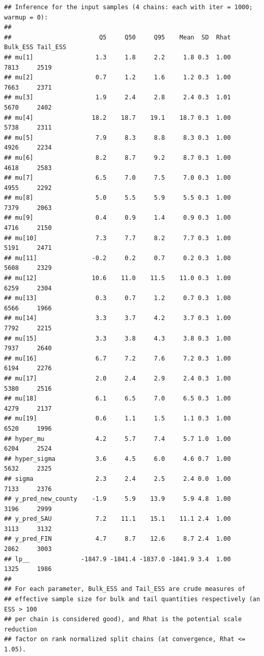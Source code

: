 \documentclass[
]{article}
\begin{document}
\begin{verbatim}
## Inference for the input samples (4 chains: each with iter = 1000; warmup = 0):
## 
##                        Q5     Q50     Q95    Mean  SD  Rhat Bulk_ESS Tail_ESS
## mu[1]                 1.3     1.8     2.2     1.8 0.3  1.00     7813     2519
## mu[2]                 0.7     1.2     1.6     1.2 0.3  1.00     7663     2371
## mu[3]                 1.9     2.4     2.8     2.4 0.3  1.01     5670     2402
## mu[4]                18.2    18.7    19.1    18.7 0.3  1.00     5738     2311
## mu[5]                 7.9     8.3     8.8     8.3 0.3  1.00     4926     2234
## mu[6]                 8.2     8.7     9.2     8.7 0.3  1.00     4618     2583
## mu[7]                 6.5     7.0     7.5     7.0 0.3  1.00     4955     2292
## mu[8]                 5.0     5.5     5.9     5.5 0.3  1.00     7379     2063
## mu[9]                 0.4     0.9     1.4     0.9 0.3  1.00     4716     2150
## mu[10]                7.3     7.7     8.2     7.7 0.3  1.00     5191     2471
## mu[11]               -0.2     0.2     0.7     0.2 0.3  1.00     5608     2329
## mu[12]               10.6    11.0    11.5    11.0 0.3  1.00     6259     2304
## mu[13]                0.3     0.7     1.2     0.7 0.3  1.00     6566     1966
## mu[14]                3.3     3.7     4.2     3.7 0.3  1.00     7792     2215
## mu[15]                3.3     3.8     4.3     3.8 0.3  1.00     7937     2640
## mu[16]                6.7     7.2     7.6     7.2 0.3  1.00     6194     2276
## mu[17]                2.0     2.4     2.9     2.4 0.3  1.00     5380     2516
## mu[18]                6.1     6.5     7.0     6.5 0.3  1.00     4279     2137
## mu[19]                0.6     1.1     1.5     1.1 0.3  1.00     6520     1996
## hyper_mu              4.2     5.7     7.4     5.7 1.0  1.00     6204     2524
## hyper_sigma           3.6     4.5     6.0     4.6 0.7  1.00     5632     2325
## sigma                 2.3     2.4     2.5     2.4 0.0  1.00     7133     2376
## y_pred_new_county    -1.9     5.9    13.9     5.9 4.8  1.00     3196     2999
## y_pred_SAU            7.2    11.1    15.1    11.1 2.4  1.00     3113     3132
## y_pred_FIN            4.7     8.7    12.6     8.7 2.4  1.00     2862     3003
## lp__              -1847.9 -1841.4 -1837.0 -1841.9 3.4  1.00     1325     1986
## 
## For each parameter, Bulk_ESS and Tail_ESS are crude measures of 
## effective sample size for bulk and tail quantities respectively (an ESS > 100 
## per chain is considered good), and Rhat is the potential scale reduction 
## factor on rank normalized split chains (at convergence, Rhat <= 1.05).
\end{verbatim}
\end{document}
